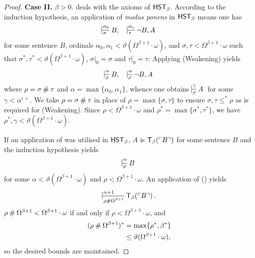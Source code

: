 \documentclass[UKenglish,cleveref,DIV=12]{scrartcl}
\theoremstyle{definition}
\theoremstyle{definition}
\begin{document}
\begin{proof}
\noindent\textbf{Case II.} \textit{${\beta>0}$.}
 deals with the axioms of $\mathsf{HST}_\beta$. According to the
induction hypothesis, an application of \emph{modus ponens} in $\mathsf{HST}_\beta$ means one has
\begin{align*}%
 \prov{\alpha_0}{\sigma}{B,}&&   \prov{\alpha_1}{\tau}{\lnot B,A}
\end{align*}
for some sentence $B$, ordinals
$\alpha_0,\alpha_1<\vartheta(\Omega^{\beta+1}\cdot\omega)$, and
$\sigma,\tau<\Omega^{\beta+1}\cdot\omega$ such that
$\sigma^*,\tau^*<\vartheta(\Omega^{\beta+1}\cdot\omega)$, $\sigma|_0=\sigma$ and $\tau|_0=\tau$. Applying (Weakening)
yields
\begin{align*}%
 \prov{\alpha}{\rho}{B,}& &\prov{\alpha}{\rho}{\lnot B,A}
\end{align*}
where $\rho=\sigma\mathbin{\#}\tau$ and $\alpha=\max\{\alpha_0,\alpha_1\}$, whence one obtains
$\prov\gamma\rho A$ for some $\gamma<\alpha^{\varepsilon+}$. We
take $\rho=\sigma\mathbin{\#}\tau$ in place of $\rho=\max\{\sigma,\tau\}$ to ensure
$\sigma,\tau\le^* \rho$ as is required for (Weakening). Since
$\rho<\Omega^{\beta+1}\cdot\omega$ and  $\rho^*=\max\{\sigma^*,\tau^*\}$, we have
$\rho^*,\gamma<\vartheta(\Omega^{\beta+1}\cdot\omega)$.

If an application of \Nec\beta was utilised in $\mathsf{HST}_\beta$, $A$ is $\mathsf{T}_\beta(\ulcorner{B}\urcorner)$ for some sentence $B$ and the induction hypothesis yields
\begin{align*}
 \prov\alpha\rho B
\end{align*}
for some $\alpha<\vartheta(\Omega^{\beta+1}\cdot\omega)$ and $\rho<\Omega^{\beta+1}\cdot\omega$. 
An application of (\Nec\beta) yields
\begin{align*}
  \prov{\alpha+1}{\rho\nsum\Omega^{\beta+1}} {\T_\beta(\gn B)}.
\end{align*}
$\rho\mathbin{\#}\Omega^{\beta+1}<\Omega^{\beta+1}\cdot\omega$ if and only if
$\rho<\Omega^{\beta+1}\cdot\omega$, and
\begin{align*}
  (\rho\mathbin{\#}\Omega^{\beta+1})^*&=\max\{\rho^*,\beta^*\}\\
	&\le\vartheta(\Omega^{\beta+1}\cdot\omega),
\end{align*}
so the desired bounds are maintained.


\end{proof}
\end{document}

